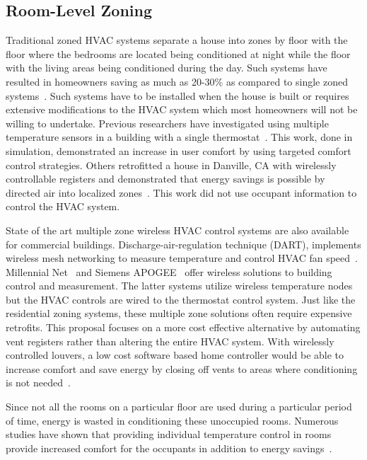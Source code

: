 \subsection{Room-Level Zoning} 
Traditional zoned HVAC systems separate a house into zones by floor with the
floor where the bedrooms are located being conditioned at night while the floor
with the living areas being conditioned during the day. Such systems have
resulted in homeowners saving as much as 20-30\% as compared to single zoned
systems~\cite{Systems2003}. Such systems have to be installed when the house is
built or requires extensive modifications to the HVAC system which most
homeowners will not be willing to undertake. Previous researchers have
investigated using multiple temperature sensors in a building with a single
thermostat~\cite{lin2002multi}. This work, done in simulation, demonstrated an
increase in user comfort by using targeted comfort control strategies. Others
retrofitted a house in Danville, CA with wirelessly controllable registers and
demonstrated that energy savings is possible by directed air into localized
zones~\cite{watts2007application}. This work did not use occupant information to
control the HVAC system.

State of the art multiple zone wireless HVAC control systems are also available
for commercial buildings. Discharge-air-regulation technique (DART), implements
wireless mesh networking to measure temperature and control HVAC fan
speed~\cite{federspiel2006wireless}. Millennial Net~\cite{Net2009} and Siemens
APOGEE~\cite{Inc.2010} offer wireless solutions to building control and
measurement. The latter systems utilize wireless temperature nodes but the HVAC
controls are wired to the thermostat control system. Just like the residential
zoning systems, these multiple zone solutions often require expensive
retrofits. This proposal focuses on a more cost effective alternative by
automating vent registers rather than altering the entire HVAC system. With
wirelessly controlled louvers, a low cost software based home controller would
be able to increase comfort and save energy by closing off vents to areas where
conditioning is not needed~\cite{redfern2006design}.

Since not all the rooms on a particular floor are used during a particular
period of time, energy is wasted in conditioning these unoccupied
rooms. Numerous studies have shown that providing individual temperature control
in rooms provide increased comfort for the occupants in addition to energy
savings~\cite{Airgonomix2008}. 

